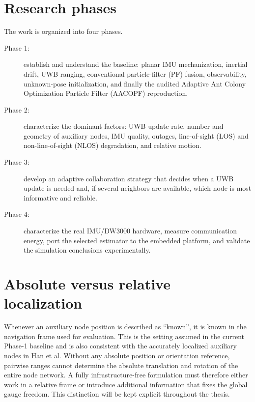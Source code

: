 \section{Research phases}
The work is organized into four phases.
\begin{description}
    \item[Phase 1:] establish and understand the baseline: planar IMU mechanization, inertial drift, UWB ranging, conventional particle-filter (PF) fusion, observability, unknown-pose initialization, and finally the audited Adaptive Ant Colony Optimization Particle Filter (AACOPF) reproduction.
    \item[Phase 2:] characterize the dominant factors: UWB update rate, number and geometry of auxiliary nodes, IMU quality, outages, line-of-sight (LOS) and non-line-of-sight (NLOS) degradation, and relative motion.
    \item[Phase 3:] develop an adaptive collaboration strategy that decides when a UWB update is needed and, if several neighbors are available, which node is most informative and reliable.
    \item[Phase 4:] characterize the real IMU/DW3000 hardware, measure communication energy, port the selected estimator to the embedded platform, and validate the simulation conclusions experimentally.
\end{description}

\section{Absolute versus relative localization}
Whenever an auxiliary node position is described as ``known'', it is known in the navigation frame used for evaluation. This is the setting assumed in the current Phase-1 baseline and is also consistent with the accurately localized auxiliary nodes in Han et al. Without any absolute position or orientation reference, pairwise ranges cannot determine the absolute translation and rotation of the entire node network. A fully infrastructure-free formulation must therefore either work in a relative frame or introduce additional information that fixes the global gauge freedom. This distinction will be kept explicit throughout the thesis.
